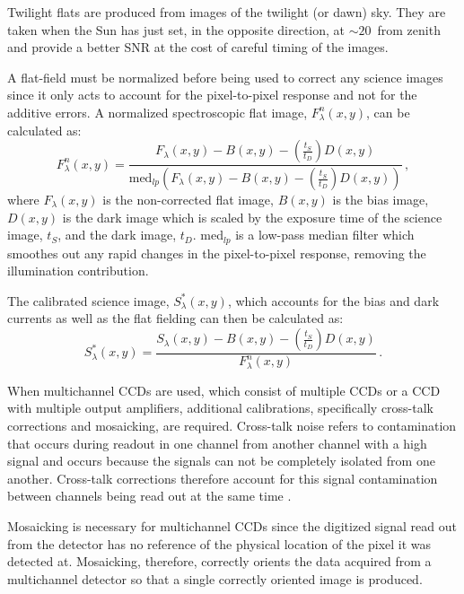 Twilight flats are produced from images of the twilight (or dawn) sky.
They are taken when the Sun has just set, in the opposite direction, at $\sim 20$\degree\ from zenith and provide a better \gls{SNR} at the cost of careful timing of the images.

A flat-field must be normalized before being used to correct any science images since it only acts to account for the pixel-to-pixel response and not for the additive errors.
A  normalized spectroscopic flat image, $F^{n}_{\lambda}(x,y)$, can be calculated as:
\begin{equation} \label{eq:norm_flat}
    F^{n}_{\lambda}(x,y) = \frac{F_{\lambda}(x,y) - B(x,y) - (\frac{t_{S}}{t_{D}})D(x,y)}{\text{med}_{lp}(F_{\lambda}(x,y) - B(x,y) - (\frac{t_{S}}{t_{D}})D(x,y))}\,,
\end{equation}
where $F_{\lambda}(x,y)$ is the non-corrected flat image, $B(x,y)$ is the bias image, $D(x,y)$ is the dark image which is scaled by the exposure time of the science image, $t_{S}$, and the dark image, $t_{D}$.
med$_{lp}$ is a low-pass median filter which smoothes out any rapid changes in the pixel-to-pixel response, removing the illumination contribution.

The calibrated science image, $S^{*}_{\lambda}(x,y)$, which accounts for the bias and dark currents as well as the flat fielding can then be calculated as:
\begin{equation} \label{eq:science_cal}
    S^{*}_{\lambda}(x,y) = \frac{S_{\lambda}(x,y) - B(x,y) - (\frac{t_{S}}{t_{D}})D(x,y)}{F^{n}_{\lambda}(x,y)}\,.
\end{equation}

When multichannel \glspl{CCD} are used, which consist of multiple \glspl{CCD} or a \gls{CCD} with multiple output amplifiers, additional calibrations, specifically cross-talk corrections and mosaicking, are required.
Cross-talk noise refers to contamination that occurs during readout in one channel from another channel with a high signal and occurs because the signals can not be completely isolated from one another.
Cross-talk corrections therefore account for this signal contamination between channels being read out at the same time \citep{CrossTalk}.

Mosaicking is necessary for multichannel \glspl{CCD} since the digitized signal read out from the detector has no reference of the physical location of the pixel it was detected at.
Mosaicking, therefore, correctly orients the data acquired from a multichannel detector so that a single correctly oriented image is produced.

